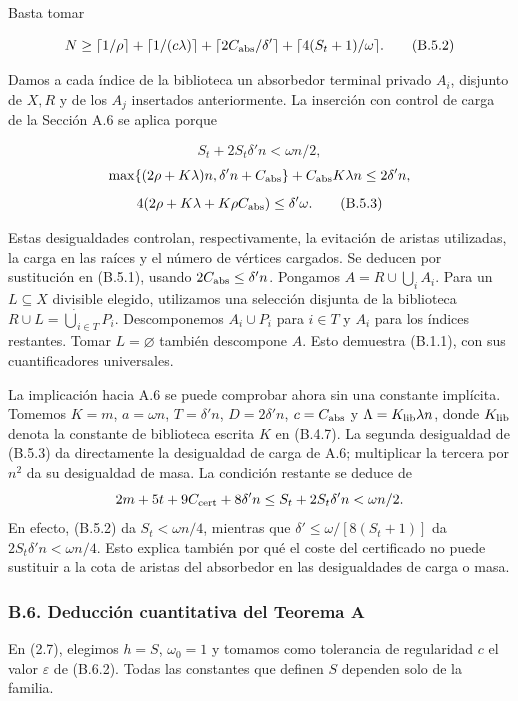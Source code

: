 \documentclass[spanish,11pt,a4paper]{article}
\begin{document}
Basta tomar

\[N\ge\lceil1/\rho\rceil+\lceil1/(c\lambda)\rceil
+\lceil2C_{\rm abs}/\delta'\rceil+\lceil4(S_t+1)/\omega\rceil.
\tag{B.5.2}\]

Damos a cada índice de la biblioteca un absorbedor terminal privado \(A_i\), disjunto de \(X,R\) y de los \(A_j\) insertados anteriormente. La inserción con control de carga de la Sección A.6 se aplica porque

\[S_t+2S_t\delta'n<\omega n/2,\] \[\max\{(2\rho+K\lambda)n,\delta'n+C_{\rm abs}\}+C_{\rm abs}K\lambda n\le2\delta'n,\] \[4(2\rho+K\lambda+K\rho C_{\rm abs})\le\delta'\omega.
\tag{B.5.3}\]

Estas desigualdades controlan, respectivamente, la evitación de aristas utilizadas, la carga en las raíces y el número de vértices cargados. Se deducen por sustitución en (B.5.1), usando \(2C_{\rm abs}\le\delta'n\). Pongamos \(A=R\cup\bigcup_i A_i\). Para un \(L\subseteq X\) divisible elegido, utilizamos una selección disjunta de la biblioteca \(R\cup L=\dot\bigcup_{i\in T}P_i\). Descomponemos \(A_i\cup P_i\) para \(i\in T\) y \(A_i\) para los índices restantes. Tomar \(L=\varnothing\) también descompone \(A\). Esto demuestra (B.1.1), con sus cuantificadores universales.

La implicación hacia A.6 se puede comprobar ahora sin una constante implícita. Tomemos \(K=m\), \(a=\omega n\), \(T=\delta'n\), \(D=2\delta'n\), \(c=C_{\rm abs}\) y \(\Lambda=K_{\rm lib}\lambda n\), donde \(K_{\rm lib}\) denota la constante de biblioteca escrita \(K\) en (B.4.7). La segunda desigualdad de (B.5.3) da directamente la desigualdad de carga de A.6; multiplicar la tercera por \(n^2\) da su desigualdad de masa. La condición restante se deduce de \[2m+5t+9C_{\rm cert}+8\delta'n
\le S_t+2S_t\delta'n<\omega n/2.\] En efecto, (B.5.2) da \(S_t<\omega n/4\), mientras que \(\delta'\le\omega/[8(S_t+1)]\) da \(2S_t\delta'n<\omega n/4\). Esto explica también por qué el coste del certificado no puede sustituir a la cota de aristas del absorbedor en las desigualdades de carga o masa.

\subsubsection{B.6. Deducción cuantitativa del Teorema A}\label{b.6.-deducciuxf3n-cuantitativa-del-teorema-a}

En (2.7), elegimos \(h=S\), \(\omega_0=1\) y tomamos como tolerancia de regularidad \(c\) el valor \(\varepsilon\) de (B.6.2). Todas las constantes que definen \(S\) dependen solo de la familia.
\end{document}
